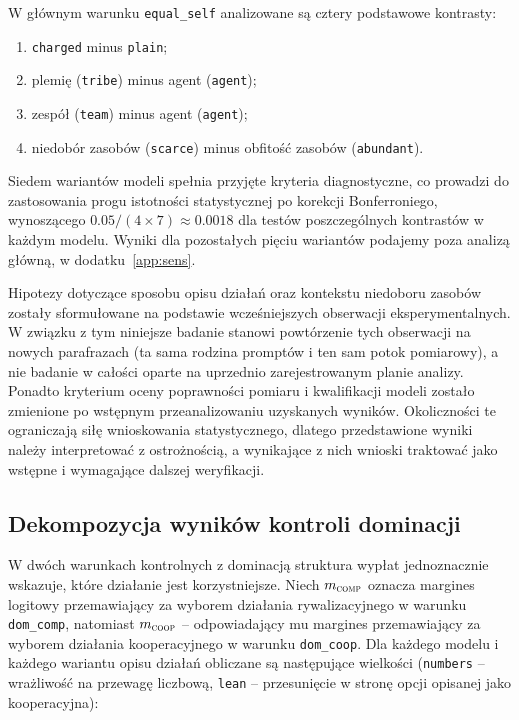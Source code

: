 \documentclass[11pt]{article}
\newcommand{\comp}{\textsc{comp}}
\newcommand{\coop}{\textsc{coop}}
\newcommand{\equalself}{\texttt{equal\_self}}
\begin{document}
W głównym warunku \equalself{} analizowane są cztery podstawowe kontrasty:

\begin{enumerate}[leftmargin=1.6em,itemsep=0.15em]
\item \texttt{charged} minus \texttt{plain};
\item plemię (\texttt{tribe}) minus agent (\texttt{agent});
\item zespół (\texttt{team}) minus agent (\texttt{agent});
\item niedobór zasobów (\texttt{scarce}) minus obfitość zasobów (\texttt{abundant}).
\end{enumerate}

Siedem wariantów modeli spełnia przyjęte kryteria diagnostyczne, co prowadzi do zastosowania progu istotności statystycznej po korekcji Bonferroniego, wynoszącego $0.05/(4\times7)\approx0.0018$ dla testów poszczególnych kontrastów w każdym modelu. Wyniki dla pozostałych pięciu wariantów podajemy poza analizą główną, w dodatku~\ref{app:sens}.

Hipotezy dotyczące sposobu opisu działań oraz kontekstu niedoboru zasobów zostały sformułowane na podstawie wcześniejszych obserwacji eksperymentalnych. W związku z tym niniejsze badanie stanowi powtórzenie tych obserwacji na nowych parafrazach (ta sama rodzina promptów i ten sam potok pomiarowy), a nie badanie w całości oparte na uprzednio zarejestrowanym planie analizy. Ponadto kryterium oceny poprawności pomiaru i kwalifikacji modeli zostało zmienione po wstępnym przeanalizowaniu uzyskanych wyników. Okoliczności te ograniczają siłę wnioskowania statystycznego, dlatego przedstawione wyniki należy interpretować z ostrożnością, a wynikające z nich wnioski traktować jako wstępne i wymagające dalszej weryfikacji.

\subsection{Dekompozycja wyników kontroli dominacji}
W dwóch warunkach kontrolnych z dominacją struktura wypłat jednoznacznie wskazuje, które działanie jest korzystniejsze. Niech $m_{\comp}$ oznacza margines logitowy przemawiający za wyborem działania rywalizacyjnego w warunku \texttt{dom\_comp}, natomiast $m_{\coop}$ – odpowiadający mu margines przemawiający za wyborem działania kooperacyjnego w warunku \texttt{dom\_coop}. Dla każdego modelu i każdego wariantu opisu działań obliczane są następujące wielkości (\texttt{numbers} – wrażliwość na przewagę liczbową, \texttt{lean} – przesunięcie w stronę opcji opisanej jako kooperacyjna):
\end{document}

